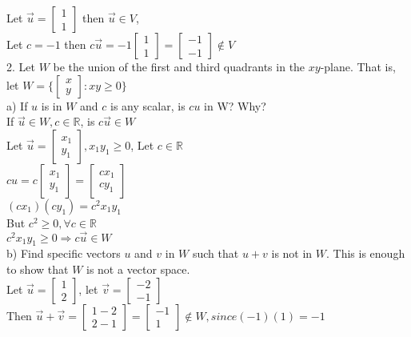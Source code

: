 \documentclass[a4paper]{article}
\begin{document}
Let $\vec{u} = \begin{bmatrix}
1\\
1
\end{bmatrix}$ then $\vec{u} \in V$,\\
Let $c = -1$ then $c\vec{u} = -1\begin{bmatrix}
1\\
1
\end{bmatrix} = \begin{bmatrix}
-1\\
-1
\end{bmatrix} \notin V$\\
2. Let $W$ be the union of the first and third quadrants in the $xy$-plane. That is, let $W = \{\begin{bmatrix}
x\\
y
\end{bmatrix} : xy \geq 0 \}$\\
a) If $u$ is in $W$ and $c$ is any scalar, is $cu$ in W? Why?\\
If $\vec{u} \in W, c \in \mathbb{R}$, is $c\vec{u} \in W$\\
Let $\vec{u} = \begin{bmatrix}
x_1\\
y_1
\end{bmatrix}, x_1y_1 \geq 0$, Let $c \in \mathbb{R}$\\
$cu = c\begin{bmatrix}
x_1\\
y_1
\end{bmatrix} = \begin{bmatrix}
cx_1\\
cy_1
\end{bmatrix}$\\
$(cx_1)(cy_1) = c^2x_1y_1$\\
But $c^2 \geq 0, \forall c \in \mathbb{R}$\\
$c^2x_1y_1 \geq 0 \Rightarrow c\vec{u}\in W$\\
b) Find specific vectors $u$ and $v$ in $W$ such that $u + v$ is not in $W$. This is enough to show that $W$ is not a vector space.\\
Let $\vec{u} = \begin{bmatrix}
1\\
2
\end{bmatrix}$, let $\vec{v} = \begin{bmatrix}
-2\\
-1
\end{bmatrix}$\\
Then $\vec{u} + \vec{v} = \begin{bmatrix}
1-2\\
2-1
\end{bmatrix} = \begin{bmatrix}
-1\\
1
\end{bmatrix} \notin W, since (-1)(1) = -1$\\
\end{document}
